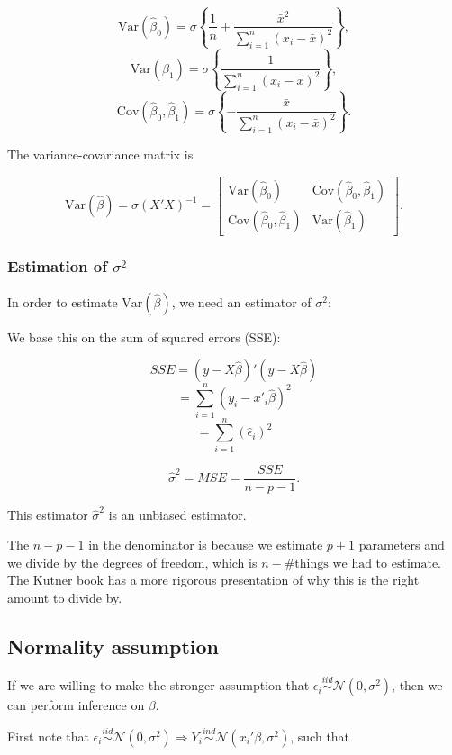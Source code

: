 \documentclass[
  letterpaper,
  DIV=11,
  numbers=noendperiod]{scrreport}
\begin{document}
\[\text{Var}(\hat \beta_0) = \sigma \left\{ \frac{1}{n} + \frac{\bar x^2}{\sum_{i=1}^n (x_i-\bar x)^2}\right\},\]
\[\text{Var}(\hat \beta_1) = \sigma \left\{\frac{1}{\sum_{i=1}^n (x_i-\bar x)^2}\right\},\]
\[\text{Cov}(\hat \beta_0, \hat \beta_1) = \sigma \left\{ - \frac{\bar x}{\sum_{i=1}^n (x_i-\bar x)^2}\right\}.\]

The variance-covariance matrix is

\[\text{Var}(\hat \beta) = \sigma(X'X)^{-1} = \left[ \begin{array}{cc} \text{Var}(\hat \beta_0) & \text{Cov}(\hat \beta_0, \hat \beta_1) \\ \text{Cov}(\hat \beta_0, \hat \beta_1) & \text{Var}(\hat \beta_1) \end{array} \right].\]

\hypertarget{estimation-of-sigma2}{%
\subsubsection{\texorpdfstring{Estimation of
\(\sigma^2\)}{Estimation of \textbackslash sigma\^{}2}}\label{estimation-of-sigma2}}

In order to estimate \(\text{Var}(\hat \beta)\), we need an estimator of
\(\sigma^2\):

We base this on the sum of squared errors (SSE):

\[SSE = (y - X\hat\beta)'(y-X\hat \beta)\]
\[ = \sum_{i=1}^n(y_i-x'_i\hat\beta)^2\]
\[ = \sum_{i=1}^n (\hat \epsilon_i)^2\]

\[\hat \sigma^2 = MSE = \frac{SSE}{n - p - 1}.\]

This estimator \(\hat \sigma^2\) is an unbiased estimator.

The \(n-p-1\) in the denominator is because we estimate \(p+1\)
parameters and we divide by the degrees of freedom, which is
\(n - \text{\# things we had to estimate}\). The Kutner book has a more
rigorous presentation of why this is the right amount to divide by.

\hypertarget{normality-assumption}{%
\subsection{Normality assumption}\label{normality-assumption}}

If we are willing to make the stronger assumption that
\(\epsilon_i \stackrel{iid}{\sim} \mathcal N(0, \sigma^2)\), then we can
perform inference on \(\beta\).

First note that
\(\epsilon_i \stackrel{iid}{\sim} \mathcal N(0, \sigma^2) \Longrightarrow Y_i \stackrel{ind}{\sim} \mathcal N(x_i'\beta, \sigma^2)\),
such that
\end{document}
